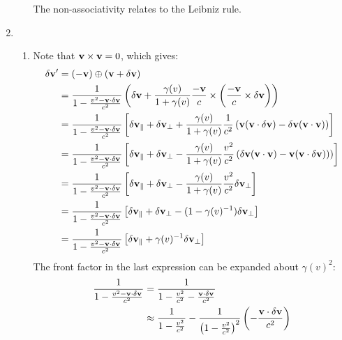 \documentclass[12pt,a4]{article}
\begin{document}
\begin{enumerate}
\begin{enumerate}
        The non-associativity relates to the Leibniz rule.
    \end{enumerate}
  \item
    \begin{enumerate}
      \item
        Note that ${\bf v} \times {\bf v} = 0$, which gives:
        \begin{align*}
          \delta {\bf v}' &= (-{\bf v}) \oplus ({\bf v + \delta v})\\
                          &= \frac{1}{1 - \frac{ v^2 - {\bf v}\cdot \delta {\bf v}}{c^2}} \left( \delta {\bf v} + \frac{\gamma(v)}{1 + \gamma(v)} \frac{- {\bf v}}{c} \times \left(\frac{- {\bf v}}{c} \times \delta {\bf v}\right)\right)\\
                          &= \frac{1}{1 - \frac{ v^2 - {\bf v}\cdot \delta {\bf v}}{c^2}}\left[ \delta {\bf v}_\parallel + \delta {\bf v}_\perp + \frac{\gamma(v)}{1 + \gamma(v)}\frac{1}{c^2} \left({\bf v}({\bf v} \cdot \delta {\bf v}) - \delta {\bf v}({\bf v} \cdot {\bf v})\right)\right]\\
                          &= \frac{1}{1 - \frac{ v^2 - {\bf v}\cdot \delta {\bf v}}{c^2}}\left[ \delta {\bf v}_\parallel + \delta {\bf v}_\perp - \frac{\gamma(v)}{1 + \gamma(v)}\frac{v^2}{c^2} \left(\delta {\bf v}({\bf v} \cdot {\bf v}) - {\bf v}({\bf v} \cdot \delta {\bf v}) )\right)\right]\\
                          &= \frac{1}{1 - \frac{ v^2 - {\bf v}\cdot \delta {\bf v}}{c^2}}\left[ \delta {\bf v}_\parallel + \delta {\bf v}_\perp - \frac{\gamma(v)}{1 + \gamma(v)}\frac{v^2}{c^2} \delta {\bf v}_\perp\right]\\
                          &= \frac{1}{1 - \frac{ v^2 - {\bf v}\cdot \delta {\bf v}}{c^2}}\left[ \delta {\bf v}_\parallel + \delta {\bf v}_\perp - (1 - \gamma(v)^{-1}) \delta {\bf v}_\perp\right]\\
                          &= \frac{1}{1 - \frac{ v^2 - {\bf v}\cdot \delta {\bf v}}{c^2}}\left[ \delta {\bf v}_\parallel +  \gamma(v)^{-1} \delta {\bf v}_\perp\right]\\
        \end{align*}
        The front factor in the last expression can be expanded about $\gamma(v)^2$:
        \begin{align*}
          \frac{1}{1 - \frac{ v^2 - {\bf v}\cdot \delta {\bf v}}{c^2}} &= \frac{1}{1 - \frac{ v^2 }{c^2} - \frac{{\bf v}\cdot \delta {\bf v}}{c^2}}\\
                                                                       &\approx \frac{1}{1 - \frac{ v^2 }{c^2} } - \frac{1}{\left(1 - \frac{ v^2 }{c^2}\right)^2 }\left(- \frac{{\bf v}\cdot \delta {\bf v}}{c^2}\right)\\

\end{align*}
\end{enumerate}
\end{enumerate}
\end{document}
